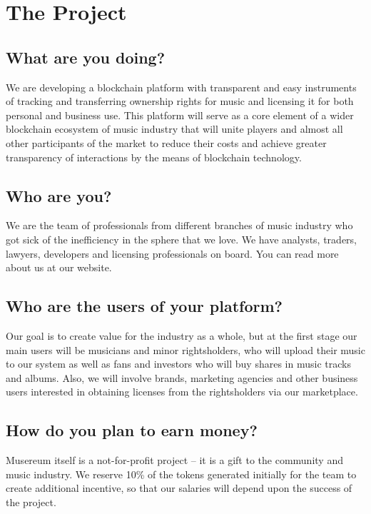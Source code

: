 \documentclass[12pt]{report}
\begin{document}
\pagebreak
\tableofcontents
\pagebreak

\chapter{The Project}
\label{project}

\section{What are you doing?}
\label{project-doing}
We are developing a blockchain platform with transparent and easy instruments of tracking and transferring ownership rights for music and licensing it for both personal and business use. This platform will serve as a core element of a wider blockchain ecosystem of music industry that will unite players and almost all other participants of the market to reduce their costs and achieve greater transparency of interactions by the means of blockchain technology.

\section{Who are you?}
\label{project-who}
We are the team of professionals from different branches of music industry who got sick of the inefficiency in the sphere that we love. We have analysts, traders, lawyers, developers and licensing professionals on board. You can read more about us at our website.

\section{Who are the users of your platform?}
\label{project-users}
Our goal is to create value for the industry as a whole, but at the first stage our main users will be musicians and minor rightsholders, who will upload their music to our system as well as fans and investors who will buy shares in music tracks and albums. Also, we will involve brands, marketing agencies and other business users interested in obtaining licenses from the rightsholders via our marketplace.

\section{How do you plan to earn money?}
\label{project-money}
Musereum itself is a not-for-profit project – it is a gift to the community and music industry. We reserve 10\% of the tokens generated initially for the team to create additional incentive, so that our salaries will depend upon the success of the project.
\end{document}
